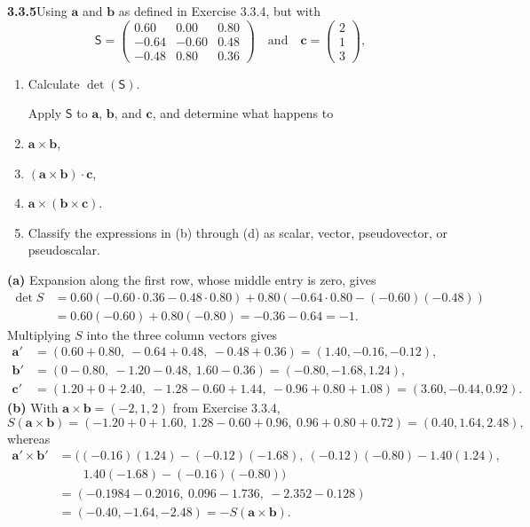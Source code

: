 \par\bigskip
\noindent\textbf{3.3.5}\quad Using $\mathbf{a}$ and $\mathbf{b}$ as defined in
Exercise 3.3.4, but with
\[
\mathsf{S}=\begin{pmatrix}0.60&0.00&0.80\\-0.64&-0.60&0.48\\
-0.48&0.80&0.36\end{pmatrix}\quad\text{and}\quad
\mathbf{c}=\begin{pmatrix}2\\1\\3\end{pmatrix},
\]
\begin{enumerate}
\item[(a)] Calculate $\det(\mathsf{S})$.

  Apply $\mathsf{S}$ to $\mathbf{a}$, $\mathbf{b}$, and $\mathbf{c}$, and
  determine what happens to
\item[(b)] $\mathbf{a}\times\mathbf{b}$,
\item[(c)] $(\mathbf{a}\times\mathbf{b})\cdot\mathbf{c}$,
\item[(d)] $\mathbf{a}\times(\mathbf{b}\times\mathbf{c})$.
\item[(e)] Classify the expressions in (b) through (d) as scalar, vector,
  pseudovector, or pseudoscalar.
\end{enumerate}
\solution
\textbf{(a)} Expansion along the first row, whose middle entry is zero,
gives
\[
\begin{aligned}
\det S&=0.60(-0.60\cdot0.36-0.48\cdot0.80)
+0.80(-0.64\cdot0.80-(-0.60)(-0.48))\\
&=0.60(-0.60)+0.80(-0.80)=-0.36-0.64=\boxed{-1}.
\end{aligned}
\]
Multiplying $S$ into the three column vectors gives
\[
\begin{aligned}
\mathbf a'&=(0.60+0.80,\ -0.64+0.48,\ -0.48+0.36)=(1.40,-0.16,-0.12),\\
\mathbf b'&=(0-0.80,\ -1.20-0.48,\ 1.60-0.36)=(-0.80,-1.68,1.24),\\
\mathbf c'&=(1.20+0+2.40,\ -1.28-0.60+1.44,\ -0.96+0.80+1.08)
=(3.60,-0.44,0.92).
\end{aligned}
\]
\textbf{(b)} With $\mathbf a\times\mathbf b=(-2,1,2)$ from
Exercise 3.3.4,
\[
S(\mathbf a\times\mathbf b)
=(-1.20+0+1.60,\ 1.28-0.60+0.96,\ 0.96+0.80+0.72)=(0.40,1.64,2.48),
\]
whereas
\[
\begin{aligned}
\mathbf a'\times\mathbf b'
&=\bigl((-0.16)(1.24)-(-0.12)(-1.68),\
(-0.12)(-0.80)-1.40(1.24),\\
&\qquad 1.40(-1.68)-(-0.16)(-0.80)\bigr)\\
&=(-0.1984-0.2016,\ 0.096-1.736,\ -2.352-0.128)\\
&=(-0.40,-1.64,-2.48)=-S(\mathbf a\times\mathbf b).
\end{aligned}
\]
